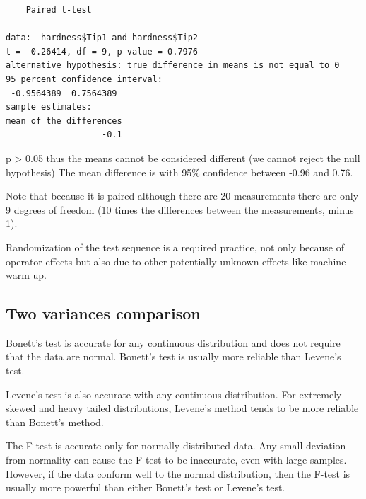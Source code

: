 \documentclass[
]{book}
\newenvironment{Shaded}{\begin{snugshade}}{\end{snugshade}}
\newcommand{\AttributeTok}[1]{\textcolor[rgb]{0.77,0.63,0.00}{#1}}
\newcommand{\ConstantTok}[1]{\textcolor[rgb]{0.00,0.00,0.00}{#1}}
\newcommand{\FunctionTok}[1]{\textcolor[rgb]{0.00,0.00,0.00}{#1}}
\newcommand{\NormalTok}[1]{#1}
\newcommand{\OtherTok}[1]{\textcolor[rgb]{0.56,0.35,0.01}{#1}}
\newcommand{\SpecialCharTok}[1]{\textcolor[rgb]{0.00,0.00,0.00}{#1}}
\newcommand{\StringTok}[1]{\textcolor[rgb]{0.31,0.60,0.02}{#1}}
\begin{document}
\begin{Shaded}
\end{Shaded}

\begin{verbatim}
	Paired t-test

data:  hardness$Tip1 and hardness$Tip2
t = -0.26414, df = 9, p-value = 0.7976
alternative hypothesis: true difference in means is not equal to 0
95 percent confidence interval:
 -0.9564389  0.7564389
sample estimates:
mean of the differences 
                   -0.1 
\end{verbatim}

p \textgreater{} 0.05 thus the means cannot be considered different (we cannot reject the null hypothesis) The mean difference is with 95\% confidence between -0.96 and 0.76.

Note that because it is paired although there are 20 measurements there are only 9 degrees of freedom (10 times the differences between the measurements, minus 1).

Randomization of the test sequence is a required practice, not only because of operator effects but also due to other potentially unknown effects like machine warm up.

\hypertarget{two-variances-comparison}{%
\subsection{Two variances comparison}\label{two-variances-comparison}}

Bonett's test is accurate for any continuous distribution and does not require that the data are normal. Bonett's test is usually more reliable than Levene's test.

Levene's test is also accurate with any continuous distribution. For extremely skewed and heavy tailed distributions, Levene's method tends to be more reliable than Bonett's method.

The F-test is accurate only for normally distributed data. Any small deviation from normality can cause the F-test to be inaccurate, even with large samples. However, if the data conform well to the normal distribution, then the F-test is usually more powerful than either Bonett's test or Levene's test.
\end{document}

